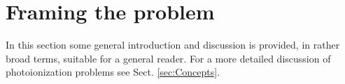 \documentclass[10pt]{article}
\begin{document}



\section{Framing the problem\label{sec:Framing}}

In this section some general introduction and discussion is provided, in rather broad terms, suitable for a general reader. For a more detailed discussion of photoionization problems see Sect. \ref{sec:Concepts}.
\end{document}

